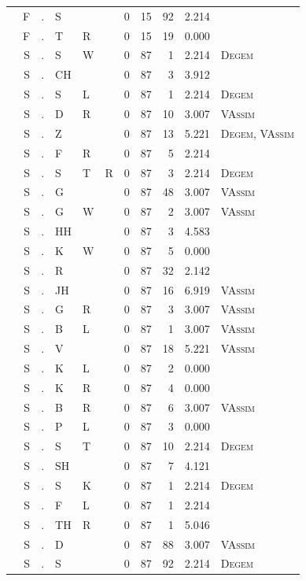 \documentclass[12pt]{article}
\begin{document}
\begin{longtable}{r@{ } r@{ } c@{ } l@{ } l@{ } l@{ } r r r r l }
 & F & . & S &  &  & 0 & 15 & 92 & 2.214 &  \\
 & F & . & T & R &  & 0 & 15 & 19 & 0.000 &  \\
 & S & . & S & W &  & 0 & 87 & 1 & 2.214 & \textsc{Degem} \\
 & S & . & CH &  &  & 0 & 87 & 3 & 3.912 &  \\
 & S & . & S & L &  & 0 & 87 & 1 & 2.214 & \textsc{Degem} \\
 & S & . & D & R &  & 0 & 87 & 10 & 3.007 & \textsc{VAssim} \\
 & S & . & Z &  &  & 0 & 87 & 13 & 5.221 & \textsc{Degem}, \textsc{VAssim} \\
 & S & . & F & R &  & 0 & 87 & 5 & 2.214 &  \\
 & S & . & S & T & R & 0 & 87 & 3 & 2.214 & \textsc{Degem} \\
 & S & . & G &  &  & 0 & 87 & 48 & 3.007 & \textsc{VAssim} \\
 & S & . & G & W &  & 0 & 87 & 2 & 3.007 & \textsc{VAssim} \\
 & S & . & HH &  &  & 0 & 87 & 3 & 4.583 &  \\
 & S & . & K & W &  & 0 & 87 & 5 & 0.000 &  \\
 & S & . & R &  &  & 0 & 87 & 32 & 2.142 &  \\
 & S & . & JH &  &  & 0 & 87 & 16 & 6.919 & \textsc{VAssim} \\
 & S & . & G & R &  & 0 & 87 & 3 & 3.007 & \textsc{VAssim} \\
 & S & . & B & L &  & 0 & 87 & 1 & 3.007 & \textsc{VAssim} \\
 & S & . & V &  &  & 0 & 87 & 18 & 5.221 & \textsc{VAssim} \\
 & S & . & K & L &  & 0 & 87 & 2 & 0.000 &  \\
 & S & . & K & R &  & 0 & 87 & 4 & 0.000 &  \\
 & S & . & B & R &  & 0 & 87 & 6 & 3.007 & \textsc{VAssim} \\
 & S & . & P & L &  & 0 & 87 & 3 & 0.000 &  \\
 & S & . & S & T &  & 0 & 87 & 10 & 2.214 & \textsc{Degem} \\
 & S & . & SH &  &  & 0 & 87 & 7 & 4.121 &  \\
 & S & . & S & K &  & 0 & 87 & 1 & 2.214 & \textsc{Degem} \\
 & S & . & F & L &  & 0 & 87 & 1 & 2.214 &  \\
 & S & . & TH & R &  & 0 & 87 & 1 & 5.046 &  \\
 & S & . & D &  &  & 0 & 87 & 88 & 3.007 & \textsc{VAssim} \\
 & S & . & S &  &  & 0 & 87 & 92 & 2.214 & \textsc{Degem} \\
\bottomrule
\end{longtable}
\end{document}
